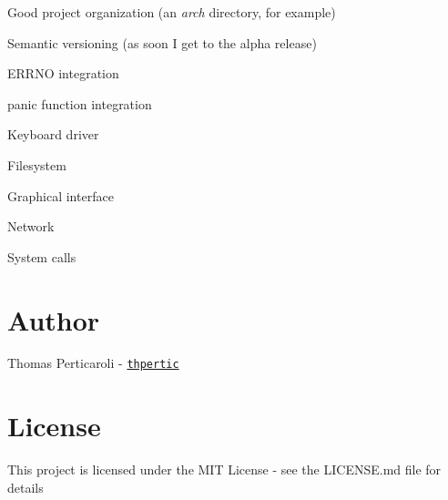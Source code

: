 \begin{DoxyItemize}
\item Good project organization (an {\itshape arch} directory, for example)
\item Semantic versioning (as soon I get to the alpha release)
\item E\+R\+R\+NO integration
\item panic function integration
\item Keyboard driver
\item Filesystem
\item Graphical interface
\item Network
\item System calls
\end{DoxyItemize}\hypertarget{index_Author}{}\section{Author}\label{index_Author}
Thomas Perticaroli -\/ \href{https://github.com/thpertic}{\tt thpertic}\hypertarget{index_License}{}\section{License}\label{index_License}
This project is licensed under the M\+IT License -\/ see the L\+I\+C\+E\+N\+SE.md file for details 